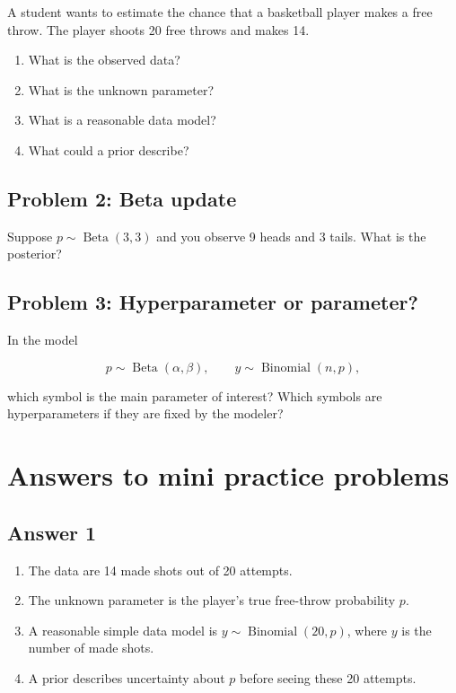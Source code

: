 \documentclass[11pt]{article}
\begin{document}
A student wants to estimate the chance that a basketball player makes a free throw. The player shoots 20 free throws and makes 14.

\begin{enumerate}[label=(\alph*), leftmargin=1.5em]
  \item What is the observed data?
  \item What is the unknown parameter?
  \item What is a reasonable data model?
  \item What could a prior describe?
\end{enumerate}

\subsection*{Problem 2: Beta update}

Suppose $p\sim\operatorname{Beta}(3,3)$ and you observe 9 heads and 3 tails. What is the posterior?

\subsection*{Problem 3: Hyperparameter or parameter?}

In the model

\[
p\sim\operatorname{Beta}(\alpha,\beta), \qquad y\sim\operatorname{Binomial}(n,p),
\]

which symbol is the main parameter of interest? Which symbols are hyperparameters if they are fixed by the modeler?

\section{Answers to mini practice problems}

\subsection*{Answer 1}

\begin{enumerate}[label=(\alph*), leftmargin=1.5em]
  \item The data are 14 made shots out of 20 attempts.
  \item The unknown parameter is the player's true free-throw probability $p$.
  \item A reasonable simple data model is $y\sim\operatorname{Binomial}(20,p)$, where $y$ is the number of made shots.
  \item A prior describes uncertainty about $p$ before seeing these 20 attempts.
\end{enumerate}
\end{document}
